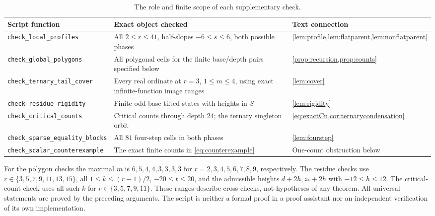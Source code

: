 \documentclass[11pt]{article}
\theoremstyle{definition}
\theoremstyle{remark}
\begin{document}
\begin{table}[tb]
\centering\small
\begin{tabular}{@{}>{\raggedright\arraybackslash}p{.34\linewidth}
>{\raggedright\arraybackslash}p{.40\linewidth}
>{\raggedright\arraybackslash}p{.18\linewidth}@{}}
\toprule
Script function & Exact object checked & Text connection\\
\midrule
\texttt{check\_local\_profiles} & All $2\le r\le41$, half-slopes
$-6\le s\le6$, both possible phases &
\cref{lem:profile,lem:flatparent,lem:nonflatparent}\\[3pt]
\texttt{check\_global\_polygons} & All polygonal cells for the finite
base/depth pairs specified below & \cref{prop:recursion,prop:counts}\\[3pt]
\texttt{check\_ternary\_tail\_cover} & Every real ordinate at
$r=3$, $1\le m\le4$, using exact infinite-function image ranges &
\cref{lem:cover}\\[3pt]
\texttt{check\_residue\_rigidity} & Finite odd-base tilted states with
heights in $S$ & \cref{lem:rigidity}\\[3pt]
\texttt{check\_critical\_counts} & Critical counts through depth $24$;
the ternary singleton orbit & \cref{eq:exactCn,cor:ternarycondensation}\\[3pt]
\texttt{check\_sparse\_equality\_blocks} & All $81$ four-step cells in
both phases & \cref{lem:fourstep}\\[3pt]
\texttt{check\_scalar\_counterexample} & The exact finite counts in
\cref{eq:counterexample} & One-count obstruction below\\
\bottomrule
\end{tabular}
\caption{The role and finite scope of each supplementary check.}
\label{tab:checks}
\end{table}

For the polygon checks the maximal $m$ is $6,5,4,4,3,3,3,3$ for
$r=2,3,4,5,6,7,8,9$, respectively. The residue checks use
$r\in\{3,5,7,9,11,13,15\}$, all $1\le k\le(r-1)/2$,
$-20\le t\le20$, and the admissible heights $d+2h,z_*+2h$ with
$-12\le h\le12$. The critical-count check uses all such $k$ for
$r\in\{3,5,7,9,11\}$.
These ranges describe cross-checks, not hypotheses of any theorem.
All universal statements are proved by the preceding arguments.
The script is neither a formal proof in a proof assistant nor an
independent verification of its own implementation.
\end{document}
